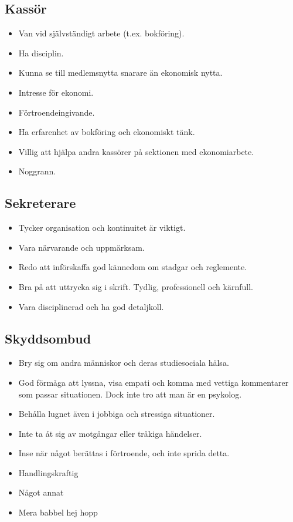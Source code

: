 \documentclass[a4paper]{article}
\begin{document}
\subsection*{Kassör}
\begin{itemize}
\item Van vid självständigt arbete (t.ex. bokföring).
\item Ha disciplin.
\item Kunna se till medlemsnytta snarare än ekonomisk nytta.
\item Intresse för ekonomi.
\item Förtroendeingivande.
\item Ha erfarenhet av bokföring och ekonomiskt tänk.
\item Villig att hjälpa andra kassörer på sektionen med ekonomiarbete.
\item Noggrann.
\end{itemize}

\subsection*{Sekreterare}
\begin{itemize}
\item Tycker organisation och kontinuitet är viktigt.
\item Vara närvarande och uppmärksam.
\item Redo att införskaffa god kännedom om stadgar och reglemente.
\item Bra på att uttrycka sig i skrift. Tydlig, professionell och kärnfull.
\item Vara disciplinerad och ha god detaljkoll.
\end{itemize}

\subsection*{Skyddsombud}
\begin{itemize}
\item Bry sig om andra människor och deras studiesociala hälsa.
\item God förmåga att lyssna, visa empati och komma med vettiga kommentarer som passar situationen. Dock inte tro att man är en psykolog.
\item Behålla lugnet även i jobbiga och stressiga situationer. 
\item Inte ta åt sig av motgångar eller tråkiga händelser.
\item Inse när något berättas i förtroende, och inte sprida detta. 
\item Handlingskraftig
\item Något annat
\item Mera babbel hej hopp
\end{itemize}
        
\end{document}
